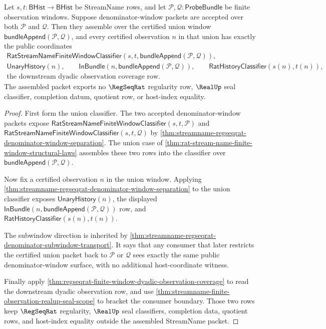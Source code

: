 \begin{theorem}
\label{thm:streamname-regseqrat-denominator-window-union-stability}
Let $s,t:\mathsf{BHist}\to\mathsf{BHist}$ be StreamName rows, and let
$\mathcal P,\mathcal Q:\mathsf{ProbeBundle}$ be finite observation windows.
Suppose denominator-window packets are accepted over both $\mathcal P$ and
$\mathcal Q$. Then they assemble over the certified union window
$\mathsf{bundleAppend}(\mathcal P,\mathcal Q)$, and every certified
observation $n$ in that union has exactly the public coordinates
$$
\begin{gathered}
\mathsf{RatStreamNameFiniteWindowClassifier}
(s,t,\mathsf{bundleAppend}(\mathcal P,\mathcal Q)),\\
\mathsf{UnaryHistory}(n),\qquad
\mathsf{InBundle}(n,\mathsf{bundleAppend}(\mathcal P,\mathcal Q)),\qquad
\mathsf{RatHistoryClassifier}(s(n),t(n)),\\
\text{the downstream dyadic observation coverage row.}
\end{gathered}
$$
The assembled packet exports no $\RegSeqRat$ regularity row, $\RealUp$ seal
classifier, completion datum, quotient row, or host-index equality.
\end{theorem}
\begin{proof}
First form the union classifier. The two accepted denominator-window packets
expose $\mathsf{RatStreamNameFiniteWindowClassifier}(s,t,\mathcal P)$ and
$\mathsf{RatStreamNameFiniteWindowClassifier}(s,t,\mathcal Q)$ by
\autoref{thm:streamname-regseqrat-denominator-window-separation}. The union
case of \autoref{thm:rat-stream-name-finite-window-structural-laws} assembles
these two rows into the classifier over
$\mathsf{bundleAppend}(\mathcal P,\mathcal Q)$.

Now fix a certified observation $n$ in the union window. Applying
\autoref{thm:streamname-regseqrat-denominator-window-separation} to the union
classifier exposes $\mathsf{UnaryHistory}(n)$, the displayed
$\mathsf{InBundle}(n,\mathsf{bundleAppend}(\mathcal P,\mathcal Q))$ row, and
$\mathsf{RatHistoryClassifier}(s(n),t(n))$.

The subwindow direction is inherited by
\autoref{thm:streamname-regseqrat-denominator-subwindow-transport}. It says
that any consumer that later restricts the certified union packet back to
$\mathcal P$ or $\mathcal Q$ sees exactly the same public denominator-window
surface, with no additional host-coordinate witness.

Finally apply
\autoref{thm:regseqrat-finite-window-dyadic-observation-coverage} to read the
downstream dyadic observation row, and use
\autoref{thm:streamname-finite-observation-realup-seal-scope} to bracket the
consumer boundary. Those two rows keep $\RegSeqRat$ regularity, $\RealUp$ seal
classifiers, completion data, quotient rows, and host-index equality outside
the assembled StreamName packet.
\end{proof}

